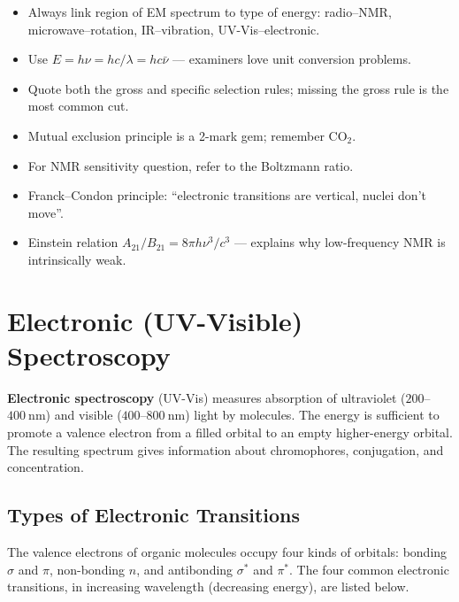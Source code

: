\documentclass[12pt,a4paper]{article}
\begin{document}
\begin{tcolorbox}[exambox, title={Exam Points (Section 1)}]
\begin{itemize}[leftmargin=*, itemsep=2pt, topsep=2pt]
  \item Always link region of EM spectrum to type of energy: radio--NMR, microwave--rotation, IR--vibration, UV-Vis--electronic.
  \item Use $E=h\nu=hc/\lambda=hc\bar{\nu}$ — examiners love unit conversion problems.
  \item Quote both the gross and specific selection rules; missing the gross rule is the most common cut.
  \item Mutual exclusion principle is a 2-mark gem; remember $\mathrm{CO_2}$.
  \item For NMR sensitivity question, refer to the Boltzmann ratio.
  \item Franck--Condon principle: ``electronic transitions are vertical, nuclei don't move''.
  \item Einstein relation $A_{21}/B_{21}=8\pi h\nu^{3}/c^{3}$ — explains why low-frequency NMR is intrinsically weak.
\end{itemize}
\end{tcolorbox}

\section{Electronic (UV-Visible) Spectroscopy}

\begin{tcolorbox}[defbox]
\textbf{Electronic spectroscopy} (UV-Vis) measures absorption of ultraviolet ($200$--$400\ \mathrm{nm}$) and visible ($400$--$800\ \mathrm{nm}$) light by molecules. The energy is sufficient to promote a valence electron from a filled orbital to an empty higher-energy orbital. The resulting spectrum gives information about chromophores, conjugation, and concentration.
\end{tcolorbox}

\subsection{Types of Electronic Transitions}
The valence electrons of organic molecules occupy four kinds of orbitals: bonding $\sigma$ and $\pi$, non-bonding $n$, and antibonding $\sigma^{*}$ and $\pi^{*}$. The four common electronic transitions, in increasing wavelength (decreasing energy), are listed below.
\end{document}
